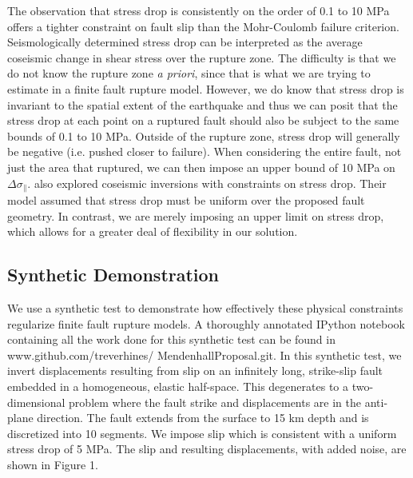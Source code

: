 \documentclass[12pt]{article}
\begin{document}
The observation that stress drop is consistently on the order of 0.1 to 10 MPa offers a tighter constraint on fault slip than the Mohr-Coulomb failure criterion.  Seismologically determined stress drop can be interpreted as the average coseismic change in shear stress over the rupture zone.  The difficulty is that we do not know the rupture zone \textit{a priori}, since that is what we are trying to estimate in a finite fault rupture model.  However, we do know that stress drop is invariant to the spatial extent of the earthquake and thus we can posit that the stress drop at each point on a ruptured fault should also be subject to the same bounds of 0.1 to 10 MPa.  Outside of the rupture zone, stress drop will generally be negative (i.e. pushed closer to failure).  When considering the entire fault, not just the area that ruptured, we can then impose an upper bound of 10 MPa on $\Delta \sigma_\parallel$.  \citet{Sun2011} also explored coseismic inversions with constraints on stress drop.  Their model assumed that stress drop must be uniform over the proposed fault geometry.   In contrast, we are merely imposing an upper limit on stress drop, which allows for a greater deal of flexibility in our solution.        

\subsection*{Synthetic Demonstration}
We use a synthetic test to demonstrate how effectively these physical constraints regularize finite fault rupture models.  A thoroughly annotated IPython notebook containing all the work done for this synthetic test can be found in www.github.com/treverhines/ MendenhallProposal.git.  In this synthetic test, we invert displacements resulting from slip on an infinitely long, strike-slip fault embedded in a homogeneous, elastic half-space.  This degenerates to a two-dimensional problem where the fault strike and displacements are in the anti-plane direction.  The fault extends from the surface to 15 km depth and is discretized into 10 segments.  We impose slip which is consistent with a uniform stress drop of 5 MPa.  The slip and resulting displacements, with added noise, are shown in Figure 1.
\end{document}
